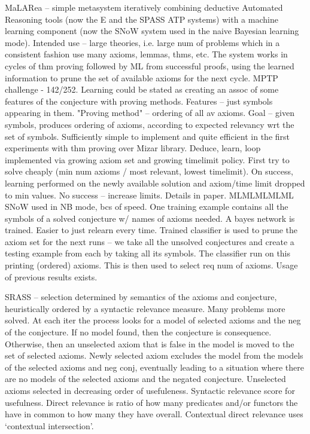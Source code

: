 \documentclass{article}
\begin{document}
MaLARea \cite{MaLARea} -- simple metasystem iteratively combining deductive
Automated Reasoning tools (now the E and the SPASS ATP systems) with a machine
learning component (now the SNoW system used in the  naive  Bayesian  learning
mode). Intended use -- large theories, i.e. large num of problems which in
a consistent fashion use many axioms, lemmas, thms, etc. The system works in
cycles of thm proving followed by ML from successful proofs, using the learned
information to prune the set of available axioms for the next cycle. MPTP
challenge - 142/252. Learning could be stated as creating an assoc of some
features of the conjecture with proving methods. Features -- just symbols
appearing in them. "Proving method" -- ordering of all av axioms. Goal -- given
symbols, produces ordering of axioms, according to expected relevancy wrt the
set of symbols. Sufficiently simple to implement and quite efficient in the
first experiments with thm proving over Mizar library. Deduce, learn, loop
implemented via growing axiom set and growing timelimit policy. First try to
solve cheaply (min num axioms / most relevant, lowest timelimit). On success,
learning performed on the newly available solution and axiom/time limit dropped
to min values. No success -- increase limits. Details in paper. MLMLMLMLML SNoW
used in NB mode, bcs of speed. One training example contains all the symbols of
a solved conjecture w/ names of axioms needed. A bayes network is trained.
Easier to just relearn every time. Trained classifier is used to prune the
axiom set for the next runs -- we take all the unsolved conjectures and create
a testing example from each by taking all its symbols. The classifier run on
this printing (ordered) axioms. This is then used to select req num of axioms.
Usage of previous results exists.

SRASS \cite{SRASS} -- selection determined by semantics of the axioms and
conjecture, heuristically ordered by a syntactic relevance measure. Many
problems more solved. At each iter the process looks for a model of selected
axioms and the neg of the conjecture. If no model found, then the conjecture is
consequence. Otherwise, then an unselected axiom that is false in the model is
moved to the set of selected axioms. Newly selected axiom excludes the model
from the models of the selected axioms and neg conj, eventually leading to
a situation where there are no models of the selected axioms and the negated
conjecture. Unselected axioms selected in decreasing order of usefuleness.
Syntactic relevance score for usefulness. Direct relevance is ratio of how many
predicates and/or functors the have in common to how many they have overall.
Contextual direct relevance uses `contextual intersection'.
\end{document}

